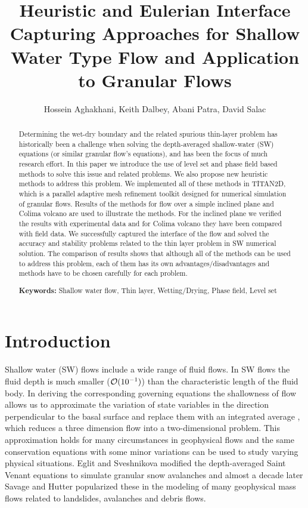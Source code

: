 \documentclass[letterpaper,10pt]{article}
\title{Heuristic and Eulerian Interface Capturing Approaches for Shallow Water Type Flow and Application to Granular Flows }
\author{Hossein Aghakhani, Keith Dalbey, Abani Patra, David Salac}
\date{}
\begin{document}
\maketitle

\begin {abstract}{
Determining the wet-dry boundary and the related spurious thin-layer problem has historically been a challenge when 
solving the depth-averaged shallow-water (SW) equations (or similar granular flow's equations), and has 
been the focus of much research effort. In this paper we introduce the use of level set and phase field based methods to solve this issue and related problems. We also propose new heuristic 
methods to address this problem. We implemented all of these methods in TITAN2D, which is a parallel adaptive mesh refinement toolkit designed for numerical simulation of granular flows. 
Results of the methods for flow over a simple inclined plane and Colima volcano are used to illustrate the methods. For the inclined plane we verified the results with experimental data and for 
Colima volcano they have been compared with field data. We successfully captured the interface of the flow and solved the accuracy and stability problems related to the thin layer problem in 
SW numerical solution. The comparison of results shows that although all of the methods can be used to address this problem, 
each of them has its own advantages/disadvantages and methods have to be chosen carefully for each problem.\newline

\textbf{Keywords:} Shallow water flow, Thin layer, Wetting/Drying, Phase field, Level set}
\end{abstract}

\section{Introduction} 
\label{introduction}
Shallow water (SW) flows include a wide range of fluid flows. In SW flows the fluid depth is much 
smaller (${\cal O}(10^{-1})$) than the characteristic length of the fluid body. In deriving the corresponding 
governing equations the shallowness of flow allows us to approximate the variation of state variables in the direction perpendicular to the basal surface and replace
them with an integrated average \cite{SavageHutter1989}, which
reduces a three dimension flow into a two-dimensional problem.
This approximation holds for many circumstances in geophysical flows and the same 
conservation equations with some minor variations can be used to study varying physical situations.
Eglit and Sveshnikova \cite{eglit1980mms} modified the depth-averaged Saint Venant equations to simulate granular snow avalanches and almost a decade later 
Savage and Hutter \cite{SavageHutter1989} popularized these in the modeling of many geophysical mass flows related to landslides, avalanches and debris flows. 
\end{document}
